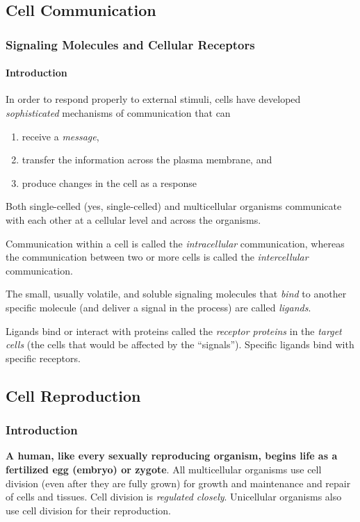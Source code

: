 \documentclass[12pt]{article}
\begin{document}
\subsection{Cell Communication}
\subsubsection{Signaling Molecules and Cellular Receptors}
\paragraph{Introduction}
In order to respond properly to external stimuli, cells have developed \emph{sophisticated} mechanisms of communication that can
\begin{enumerate}
    \item receive a \emph{message},
    \item transfer the information across the plasma membrane, and
    \item produce changes in the cell as a response
\end{enumerate}
Both single-celled (yes, single-celled) and multicellular organisms communicate with each other at a cellular level and across the organisms.

Communication within a cell is called the \emph{intracellular} communication, whereas the communication between two or more cells is called the \emph{intercellular} communication.

The small, usually volatile, and soluble signaling molecules that \emph{bind} to another specific molecule (and deliver a signal in the process) are called \emph{ligands}.

Ligands bind or interact with proteins called the \emph{receptor proteins} in the \emph{target cells} (the cells that would be affected by the ``signals''). Specific ligands bind with specific receptors. 

\subsection{Cell Reproduction}
\subsubsection{Introduction}
\textbf{A human, like every sexually reproducing organism, begins life as a fertilized egg (embryo) or zygote}. All multicellular organisms use cell division (even after they are fully grown) for growth and maintenance and repair of cells and tissues. Cell division is \emph{regulated closely}. Unicellular organisms also use cell division for their reproduction. 
\end{document}

